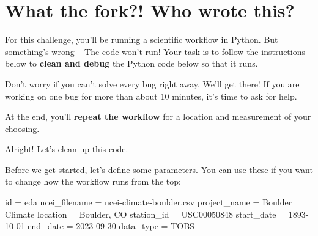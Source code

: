 \documentclass[
  letterpaper,
  DIV=11,
  numbers=noendperiod,
  oneside]{scrreprt}
\newenvironment{Shaded}{\begin{snugshade}}{\end{snugshade}}
\newcommand{\BuiltInTok}[1]{\textcolor[rgb]{0.00,0.23,0.31}{#1}}
\newcommand{\NormalTok}[1]{\textcolor[rgb]{0.00,0.23,0.31}{#1}}
\newcommand{\OperatorTok}[1]{\textcolor[rgb]{0.37,0.37,0.37}{#1}}
\newcommand{\StringTok}[1]{\textcolor[rgb]{0.13,0.47,0.30}{#1}}
\begin{document}
\section{What the fork?! Who wrote
this?}\label{what-the-fork-who-wrote-this-1}

For this challenge, you'll be running a scientific workflow in Python.
But something's wrong -- The code won't run! Your task is to follow the
instructions below to \textbf{clean and debug} the Python code below so
that it runs.

\begin{tcolorbox}[enhanced jigsaw, colbacktitle=quarto-callout-tip-color!10!white, opacityback=0, bottomtitle=1mm, toptitle=1mm, bottomrule=.15mm, left=2mm, colframe=quarto-callout-tip-color-frame, leftrule=.75mm, opacitybacktitle=0.6, colback=white, rightrule=.15mm, toprule=.15mm, breakable, titlerule=0mm, title=\textcolor{quarto-callout-tip-color}{\faLightbulb}\hspace{0.5em}{Tip}, coltitle=black, arc=.35mm]

Don't worry if you can't solve every bug right away. We'll get there! If
you are working on one bug for more than about 10 minutes, it's time to
ask for help.

\end{tcolorbox}

At the end, you'll \textbf{repeat the workflow} for a location and
measurement of your choosing.

Alright! Let's clean up this code.

Before we get started, let's define some parameters. You can use these
if you want to change how the workflow runs from the top:

\begin{Shaded}
\begin{Highlighting}[]
\BuiltInTok{id} \OperatorTok{=} \StringTok{\textquotesingle{}eda\textquotesingle{}}
\NormalTok{ncei\_filename }\OperatorTok{=} \StringTok{\textquotesingle{}ncei{-}climate{-}boulder.csv\textquotesingle{}}
\NormalTok{project\_name }\OperatorTok{=} \StringTok{\textquotesingle{}Boulder Climate\textquotesingle{}}
\NormalTok{location }\OperatorTok{=} \StringTok{\textquotesingle{}Boulder, CO\textquotesingle{}}
\NormalTok{station\_id }\OperatorTok{=} \StringTok{\textquotesingle{}USC00050848\textquotesingle{}}
\NormalTok{start\_date }\OperatorTok{=} \StringTok{\textquotesingle{}1893{-}10{-}01\textquotesingle{}}
\NormalTok{end\_date }\OperatorTok{=} \StringTok{\textquotesingle{}2023{-}09{-}30\textquotesingle{}}
\NormalTok{data\_type }\OperatorTok{=} \StringTok{\textquotesingle{}TOBS\textquotesingle{}}
\end{Highlighting}
\end{Shaded}
\end{document}
